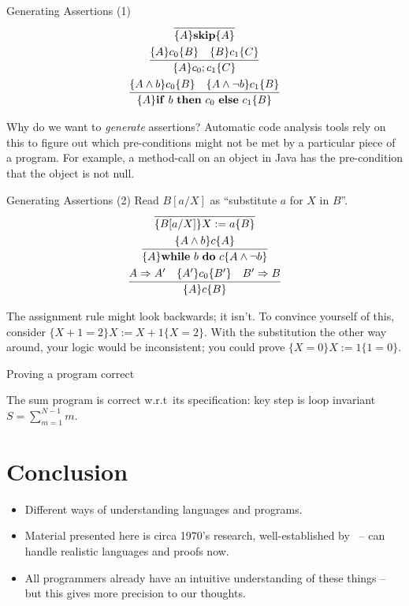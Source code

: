 \begin{frame}{Generating Assertions (1)}
    \begin{gather*}
        \infer{\{A\}\mathbf{skip}\{A\}}{} \\
        \infer{\{A\}c_0; c_1\{C\}}{\{A\}c_0\{B\} \quad \{B\}c_1\{C\}} \\
        \infer{\{A\}\mathbf{if}\ b\ \mathbf{then}\ c_0\ \mathbf{else}\ c_1\{B\}}{\{A \wedge b\}c_0\{B\} \quad \{A \wedge \neg b\}c_1\{B\}}
    \end{gather*}
\end{frame}

Why do we want to \emph{generate} assertions? Automatic code analysis tools
rely on this to figure out which pre-conditions might not be met by a
particular piece of a program. For example, a method-call on an object in
Java has the pre-condition that the object is not null.

\begin{frame}{Generating Assertions (2)}
    Read $B[a/X]$ as ``substitute $a$ for $X$ in $B$''.
    \begin{gather*}
        \infer{\{B[a/X]\}X := a\{B\}}{} \\
        \infer{\{A\}\mathbf{while}\ b\ \mathbf{do}\ c\{A \wedge \neg b\}}{\{A \wedge b\}c\{A\}} \\
        \infer{\{A\}c\{B\}}{A \Rightarrow A' \quad \{A'\}c_0\{B'\} \quad B' \Rightarrow B}
    \end{gather*}
\end{frame}

The assignment rule might look backwards; it isn't. To convince yourself of
this, consider $\{X + 1 = 2\} X := X + 1 \{X = 2\}$. With the substitution the
other way around, your logic would be inconsistent; you could prove $\{X = 0\}
X := 1 \{ 1 = 0 \}$.

\begin{frame}{Proving a program correct}
    \begin{theorem}
        The sum program is correct w.r.t~its specification: key step is loop invariant
        $S = \sum_{m=1}^{N-1}m$.
    \end{theorem}
\end{frame}


\section{Conclusion}

\begin{frame}
    \begin{itemize}[<+->]
        \item Different ways of understanding languages and programs.
        \item Material presented here is circa 1970's research,
        well-established by~\citet{winskel1993formal} -- can handle
        realistic languages and proofs now.
        \item All programmers already have an intuitive understanding of these
            things -- but this gives more precision to our thoughts.
    \end{itemize}
\end{frame}

